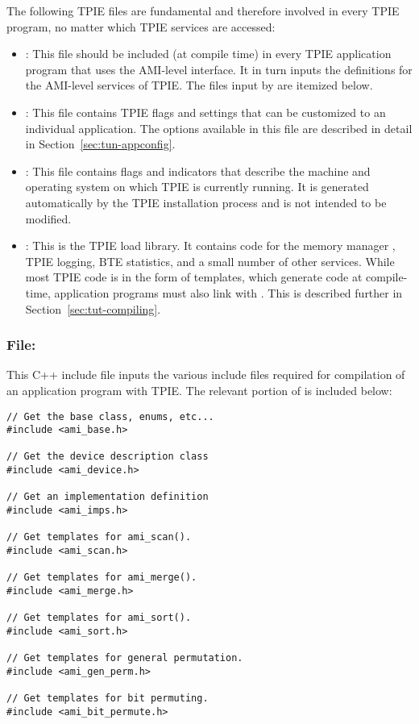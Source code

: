 The following TPIE files are fundamental and therefore
involved in every TPIE program, no matter which TPIE
services are accessed:

\begin{itemize}
    \item {}: This file should be included
    (at compile time) in every TPIE application program that
    uses the AMI-level interface. It in turn inputs the
    definitions for the AMI-level services of TPIE. The
    files input by  are itemized below.

    \item {}: This file contains TPIE
    flags and settings that can be customized to an
    individual application. The options available in this
    file are described in detail in
    Section~\ref{sec:tun-appconfig}.

    \item {}: This file contains flags and
    indicators that describe the machine and operating
    system on which TPIE is currently running. It is
    generated automatically by the TPIE installation
    process and is not intended to be modified.
    
    \item {}: This is the TPIE load
    library. It contains code for the memory manager
    , TPIE logging, BTE statistics, and a
    small number of other services. While most TPIE code is
    in the form of templates, which generate code at
    compile-time, application programs must also link with
    . This is described further in
    Section~\ref{sec:tut-compiling}.
\end{itemize} 

\subsubsection{File: } This C++ include
file inputs the various include files required for
compilation of an application program with TPIE. The relevant portion
of  is included below:

\begin{verbatim}
// Get the base class, enums, etc...
#include <ami_base.h>

// Get the device description class
#include <ami_device.h>

// Get an implementation definition
#include <ami_imps.h>

// Get templates for ami_scan().
#include <ami_scan.h>

// Get templates for ami_merge().
#include <ami_merge.h>

// Get templates for ami_sort().
#include <ami_sort.h>

// Get templates for general permutation.
#include <ami_gen_perm.h>

// Get templates for bit permuting.
#include <ami_bit_permute.h>
\end{verbatim} 

